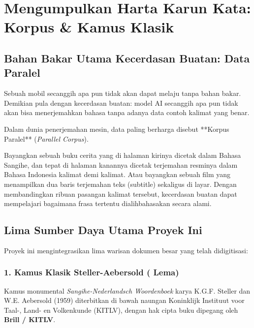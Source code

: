 \chapter{Mengumpulkan Harta Karun Kata: Korpus \& Kamus Klasik}

\section{Bahan Bakar Utama Kecerdasan Buatan: Data Paralel}
Sebuah mobil secanggih apa pun tidak akan dapat melaju tanpa bahan bakar. Demikian pula dengan kecerdasan buatan: model AI secanggih apa pun tidak akan bisa menerjemahkan bahasa tanpa adanya data contoh kalimat yang benar.

Dalam dunia penerjemahan mesin, data paling berharga disebut **Korpus Paralel** (\textit{Parallel Corpus}).

\begin{infobox}
Bayangkan sebuah buku cerita yang di halaman kirinya dicetak dalam Bahasa Sangihe, dan tepat di halaman kanannya dicetak terjemahan resminya dalam Bahasa Indonesia kalimat demi kalimat. Atau bayangkan sebuah film yang menampilkan dua baris terjemahan teks (subtitle) sekaligus di layar. Dengan membandingkan ribuan pasangan kalimat tersebut, kecerdasan buatan dapat mempelajari bagaimana frasa tertentu dialihbahasakan secara alami.
\end{infobox}

\section{Lima Sumber Daya Utama Proyek Ini}
Proyek ini mengintegrasikan lima warisan dokumen besar yang telah didigitisasi:

\subsection{1. Kamus Klasik Steller-Aebersold (\StatLemmaTotal{} Lema)}
Kamus monumental \textit{Sangihe-Nederlandsch Woordenboek} karya K.G.F. Steller dan W.E. Aebersold (1959) diterbitkan di bawah naungan Koninklijk Instituut voor Taal-, Land- en Volkenkunde (KITLV), dengan hak cipta buku dipegang oleh \textbf{Brill / KITLV}. 

